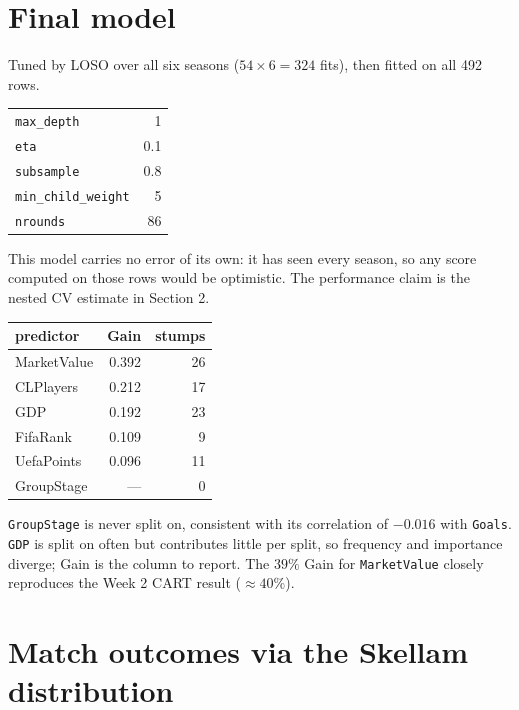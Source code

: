 \documentclass[11pt,a4paper]{article}
\begin{document}
\section{Final model}

Tuned by LOSO over all six seasons ($54 \times 6 = 324$ fits), then
fitted on all 492 rows.

\begin{center}
\begin{tabular}{lr}
  \toprule
  \texttt{max\_depth}         & 1 \\
  \texttt{eta}                & 0.1 \\
  \texttt{subsample}          & 0.8 \\
  \texttt{min\_child\_weight} & 5 \\
  \texttt{nrounds}            & 86 \\
  \bottomrule
\end{tabular}
\end{center}

This model carries no error of its own: it has seen every season, so any
score computed on those rows would be optimistic. The performance claim
is the nested CV estimate in Section 2.

\begin{center}
\begin{tabular}{lrr}
  \toprule
  predictor & Gain & stumps \\
  \midrule
  MarketValue & 0.392 & 26 \\
  CLPlayers   & 0.212 & 17 \\
  GDP         & 0.192 & 23 \\
  FifaRank    & 0.109 &  9 \\
  UefaPoints  & 0.096 & 11 \\
  GroupStage  & ---   &  0 \\
  \bottomrule
\end{tabular}
\end{center}

\texttt{GroupStage} is never split on, consistent with its correlation of
$-0.016$ with \texttt{Goals}. \texttt{GDP} is split on often but
contributes little per split, so frequency and importance diverge; Gain
is the column to report. The $39\%$ Gain for \texttt{MarketValue} closely
reproduces the Week 2 CART result ($\approx 40\%$).


\section{Match outcomes via the Skellam distribution}
\end{document}
